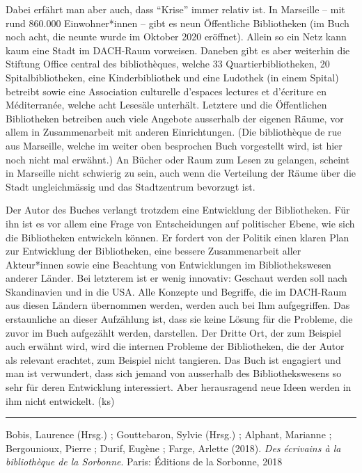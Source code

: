 \documentclass[a4paper,
fontsize=11pt,
oneside,
numbers=noperiodatend,
parskip=half-,
bibliography=totoc,
final
]{scrartcl}
\begin{document}
Dabei erfährt man aber auch, dass \enquote{Krise} immer relativ ist. In
Marseille -- mit rund 860.000 Einwohner*innen -- gibt es neun
Öffentliche Bibliotheken (im Buch noch acht, die neunte wurde im Oktober
2020 eröffnet). Allein so ein Netz kann kaum eine Stadt im DACH-Raum
vorweisen. Daneben gibt es aber weiterhin die Stiftung Office central
des bibliothèques, welche 33 Quartierbibliotheken, 20
Spitalbibliotheken, eine Kinderbibliothek und eine Ludothek (in einem
Spital) betreibt sowie eine Association culturelle d'espaces lectures et
d'écriture en Méditerranée, welche acht Lesesäle unterhält. Letztere und
die Öffentlichen Bibliotheken betreiben auch viele Angebote ausserhalb
der eigenen Räume, vor allem in Zusammenarbeit mit anderen
Einrichtungen. (Die bibliothèque de rue aus Marseille, welche im weiter
oben besprochen Buch vorgestellt wird, ist hier noch nicht mal erwähnt.)
An Bücher oder Raum zum Lesen zu gelangen, scheint in Marseille nicht
schwierig zu sein, auch wenn die Verteilung der Räume über die Stadt
ungleichmässig und das Stadtzentrum bevorzugt ist.

Der Autor des Buches verlangt trotzdem eine Entwicklung der
Bibliotheken. Für ihn ist es vor allem eine Frage von Entscheidungen auf
politischer Ebene, wie sich die Bibliotheken entwickeln können. Er
fordert von der Politik einen klaren Plan zur Entwicklung der
Bibliotheken, eine bessere Zusammenarbeit aller Akteur*innen sowie eine
Beachtung von Entwicklungen im Bibliothekswesen anderer Länder. Bei
letzterem ist er wenig innovativ: Geschaut werden soll nach Skandinavien
und in die USA. Alle Konzepte und Begriffe, die im DACH-Raum aus diesen
Ländern übernommen werden, werden auch bei Ihm aufgegriffen. Das
erstaunliche an dieser Aufzählung ist, dass sie keine Lösung für die
Probleme, die zuvor im Buch aufgezählt werden, darstellen. Der Dritte
Ort, der zum Beispiel auch erwähnt wird, wird die internen Probleme der
Bibliotheken, die der Autor als relevant erachtet, zum Beispiel nicht
tangieren. Das Buch ist engagiert und man ist verwundert, dass sich
jemand von ausserhalb des Bibliothekswesens so sehr für deren
Entwicklung interessiert. Aber herausragend neue Ideen werden in ihm
nicht entwickelt. (ks)

\begin{center}\rule{0.5\linewidth}{0.5pt}\end{center}

Bobis, Laurence (Hrsg.) ; Gouttebaron, Sylvie (Hrsg.) ; Alphant,
Marianne ; Bergounioux, Pierre ; Durif, Eugène ; Farge, Arlette (2018).
\emph{Des écrivains à la bibliothèque de la Sorbonne}. Paris: Éditions
de la Sorbonne, 2018
\end{document}
